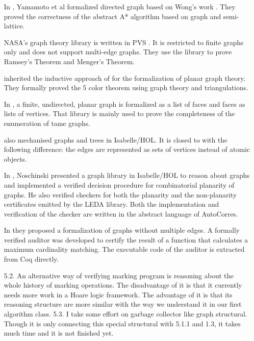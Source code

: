 In \cite{yamamoto1998formalization}, Yamamoto et al formalized
directed graph based on Wong's work \cite{wong1991}. They proved the
correctness of the abstract A* algorithm based on graph and
semi-lattice. \cite{tamai2000formal}

NASA's graph theory library is written in PVS
\cite{R.W.:1998:PGT:886490}. It is restricted to finite graphs only
and does not support multi-edge graphs. They use the library to prove
Ramsey's Theorem and Menger's Theorem.

\cite{bauer20025} inherited the inductive approach of
\cite{yamamoto1995formalization} for the formalization of planar graph
theory. They formally proved the 5 color theorem using graph theory
and triangulations.

In \cite{nipkow2006flyspeck}, a finite, undirected, planar graph is
formalized as a list of faces and faces as lists of vertices. That
library is mainly used to prove the completeness of the enumeration of
tame graphs.

\cite{ridge2005graphs} also mechanised graphs and trees in
Isabelle/HOL. It is closed to \cite{wong1991} with the following
difference: the edges are represented as sets of vertices instead of
atomic objects.

In \cite{noschinski2015formalizing}, Noschinski presented a graph
library in Isabelle/HOL to reason about graphs and implemented a
verified decision procedure for combinatorial planarity of graphs. He
also verified checkers for both the planarity and the non-planarity
certificates emitted by the LEDA library. Both the implementation and
verification of the checker are written in the abstract language of
AutoCorres.

In \cite{dubois2015graphes} they proposed a formalization of graphs
without multiple edges. A formally verified auditor was developed to
certify the result of a function that calculates a maximum cardinality
matching. The executable code of the auditor is extracted from Coq
directly.

{\color{magenta}
5.2. An alternative way of verifying marking program is reasoning about the whole history of marking operations. The disadvantage of it is that it currently needs more work in a Hoare logic framework. The advantage of it is that its reasoning structure are more similar with the way we understand it in our first algorithm class.
5.3. I take some effort on garbage collector like graph structural. Though it is only connecting this special structural with 5.1.1 and 1.3, it takes much time and it is not finished yet.}

